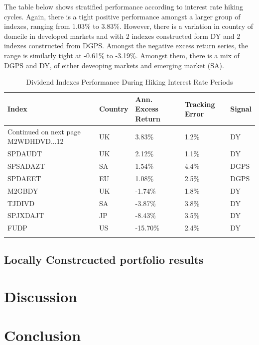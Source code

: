 \documentclass[11pt,preprint, authoryear]{elsarticle}
\numberwithin{equation}{section}
\numberwithin{figure}{section}
\numberwithin{table}{section}
\begin{document}
The table below shows stratified performance according to interest rate
hiking cycles. Again, there is a tight positive performance amongst a
larger group of indexes, ranging from 1.03\% to 3.83\%. However, there
is a variation in country of domcile in developed markets and with 2
indexes constructed form DY and 2 indexes constructed from DGPS. Amongst
the negative excess return series, the range is similarly tight at
-0.61\% to -3.19\%. Amongst them, there is a mix of DGPS and DY, of
either deveoping markets and emerging market (SA).
\begingroup\fontsize{12pt}{13pt}\selectfont

\begin{longtable}{lllll}
  \toprule
Index & Country & Ann. Excess Return & Tracking Error & Signal \\ 
  \hline 
\endhead 
\hline 
{\footnotesize Continued on next page} 
\endfoot 
\endlastfoot 
 \midrule
M2WDHDVD...12 & UK &   3.83\% & 1.2\% & DY \\ 
  SPDAUDT & UK &   2.12\% & 1.1\% & DY \\ 
  SPSADAZT & SA &   1.54\% & 4.4\% & DGPS \\ 
  SPDAEET & EU &   1.08\% & 2.5\% & DGPS \\ 
  M2GBDY & UK &  -1.74\% & 1.8\% & DY \\ 
  TJDIVD & SA &  -3.87\% & 3.8\% & DY \\ 
  SPJXDAJT & JP &  -8.43\% & 3.5\% & DY \\ 
  FUDP & US & -15.70\% & 2.4\% & DY \\ 
   \bottomrule
\caption{Dividend Indexes Performance During Hiking Interest Rate Periods} 
\end{longtable}
\endgroup

\hypertarget{locally-constrcucted-portfolio-results}{%
\subsection{Locally Constrcucted portfolio
results}\label{locally-constrcucted-portfolio-results}}

\hypertarget{discussion}{%
\section*{Discussion}\label{discussion}}

\hypertarget{conclusion}{%
\section*{Conclusion}\label{conclusion}}
\end{document}
